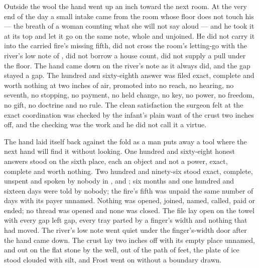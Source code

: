 Outside the wool the hand went up an inch toward the next room. At the very end of the day a small intake came from the room whose floor does not touch his --- the breath of a woman counting what she will not say aloud --- and he took it at its top and let it go on the same note, whole and unjoined. He did not carry it into the carried fire's missing fifth, did not cross the room's letting-go with the river's low note of , did not borrow a house count, did not supply a pull under the floor. The hand came down on the river's note as it always did, and the gap stayed a gap. The hundred and sixty-eighth answer was filed exact, complete and worth nothing at two inches of air, promoted into no reach, no hearing, no seventh, no stopping, no payment, no held change, no key, no power, no freedom, no gift, no doctrine and no rule. The clean satisfaction the surgeon felt at the exact coordination was checked by the infant's plain want of the crust two inches off, and the checking was the work and he did not call it a virtue.

The hand laid itself back against the fold as a man puts away a tool where the next hand will find it without looking. One hundred and sixty-eight honest answers stood on the sixth place, each an object and not a power, exact, complete and worth nothing. Two hundred and ninety-six stood exact, complete, unspent and spoken by nobody in ,  and ; six months and one hundred and sixteen days were told by nobody; the fire's fifth was unpaid the same number of days with its payer unnamed. Nothing was opened, joined, named, called, paid or ended; no thread was opened and none was closed. The file lay open on the towel with every gap left gap, every tray parted by a finger's width and nothing that had moved. The river's low note went quiet under the finger's-width door after the hand came down. The crust lay two inches off with its empty place unnamed, and out on the flat stone by the well, out of the path of feet, the plate of ice stood clouded with silt, and Frost went on without a boundary drawn.
